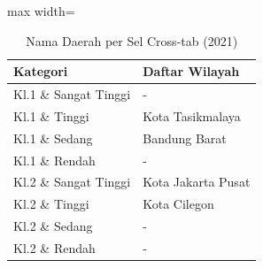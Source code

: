 \begin{table}[H]
\centering
\caption{Nama Daerah per Sel Cross-tab (2021)} \label{tab:crossname2021}
\begin{adjustbox}{max width=\textwidth}
\begin{tabular}{|p{4cm}|p{10cm}|}
\hline
\textbf{Kategori} & \textbf{Daftar Wilayah} \\
\hline
Kl.1 \& Sangat Tinggi & - \\
\hline
Kl.1 \& Tinggi & Kota Tasikmalaya \\
\hline
Kl.1 \& Sedang & Bandung Barat \\
\hline
Kl.1 \& Rendah & - \\
\hline
Kl.2 \& Sangat Tinggi & Kota Jakarta Pusat \\
\hline
Kl.2 \& Tinggi & Kota Cilegon \\
\hline
Kl.2 \& Sedang & - \\
\hline
Kl.2 \& Rendah & - \\
\hline
\end{tabular}
\end{adjustbox}
\end{table}